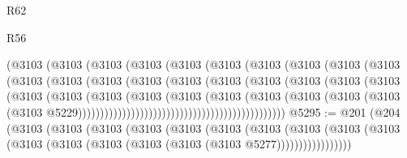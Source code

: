 \begin{lexlean}{R62}
\begin{lexlean}{R56}
\begin{coremodule}
{{{{{{{{{{{{{{{{{{{{{{{{{{{{{{{{{{{{{{{{{{{{{{{{{{{{{{{{{{{{{{{{{{{{{{{{{{{{{{{{{{{{{{{{{{{{{{{{{{{{{{{{{{{{{{{{{{{{{{{{{{{{{{{{{{{{{{{{{{{{{{{{{{{{{{{{{{{{{{{{{{{{{{{{{{{{{{{{{{{{{{{{{{{{{{{{{{{{{{{{{{{{{{{{{{{                                    (@3103
                                      (@3103
                                        (@3103
                                          (@3103
                                            (@3103
                                              (@3103
                                                (@3103
                                                  (@3103
                                                    (@3103
                                                      (@3103
                                                        (@3103
                                                          (@3103
                                                            (@3103
                                                              (@3103
                                                                (@3103
                                                                  (@3103
                                                                    (@3103
                                                                      (@3103
                                                                        (@3103
                                                                          (@3103
                                                                            (@3103
                                                                              (@3103
                                                                                (@3103
                                                                                  (@3103
                                                                                    (@3103
                                                                                      (@3103
                                                                                        (@3103
                                                                                          (@3103
                                                                                            (@3103
                                                                                              (@3103
                                                                                                (@3103
                                                                                                  @5229)))))))))))))))))))))))))))))))))))))))))))))))
@5295 := @201
    (@204
      (@3103
        (@3103
          (@3103
            (@3103
              (@3103
                (@3103
                  (@3103
                    (@3103
                      (@3103 (@3103 (@3103 (@3103 (@3103 (@3103 (@3103 (@3103 @5277)))))))))))))))))
}}}}}}}}}}}}}}}}}}}}}}}}}}}}}}}}}}}}}}}}}}}}}}}}}}}}}}}}}}}}}}}}}}}}}}}}}}}}}}}}}}}}}}}}}}}}}}}}}}}}}}}}}}}}}}}}}}}}}}}}}}}}}}}}}}}}}}}}}}}}}}}}}}}}}}}}}}}}}}}}}}}}}}}}}}}}}}}}}}}}}}}}}}}}}}}}}}}}}}}}}}}}}}}}}}}
\end{coremodule}
\end{lexlean}
\end{lexlean}
